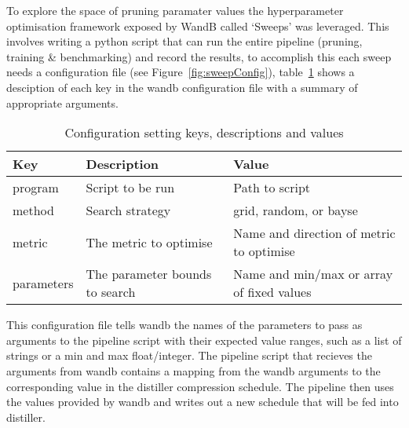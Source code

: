 \documentclass[../Dissertation.tex]{subfiles}
\begin{document}
To explore the space of pruning paramater values the hyperparameter optimisation framework exposed by WandB called `Sweeps' was leveraged. 
This involves writing a python script that can run the entire pipeline (pruning, training \& benchmarking) and record the results, to accomplish this each sweep needs a configuration file (see Figure~\ref{fig:sweepConfig}), table~\ref{tab:WandBConfig} shows a desciption of each key in the wandb configuration file with a summary of appropriate arguments. 



\begin{table}[H]
    \begin{tabular}{@{}|l|l|l|@{}}
    \toprule
    Key        & Description                    & Value                                    \\ \midrule
    program    & Script to be run               & Path to script                           \\ \midrule
    method     & Search strategy                & grid, random, or bayse                   \\ \midrule
    metric     & The metric to optimise         & Name and direction of metric to optimise \\ \midrule
    parameters & The parameter bounds to search & Name and min/max or array of fixed values  \\ \bottomrule
    \end{tabular}
    \caption{Configuration setting keys, descriptions and values}
    \label{tab:WandBConfig}
\end{table}




This configuration file tells wandb the names of the parameters to pass as arguments to the pipeline script with their expected value ranges, such as a list of strings or a min and max float/integer. 
The pipeline script that recieves the arguments from wandb contains a mapping from the wandb arguments to the corresponding value in the distiller compression schedule.
The pipeline then uses the values provided by wandb and writes out a new schedule that will be fed into distiller. 

\end{document}
